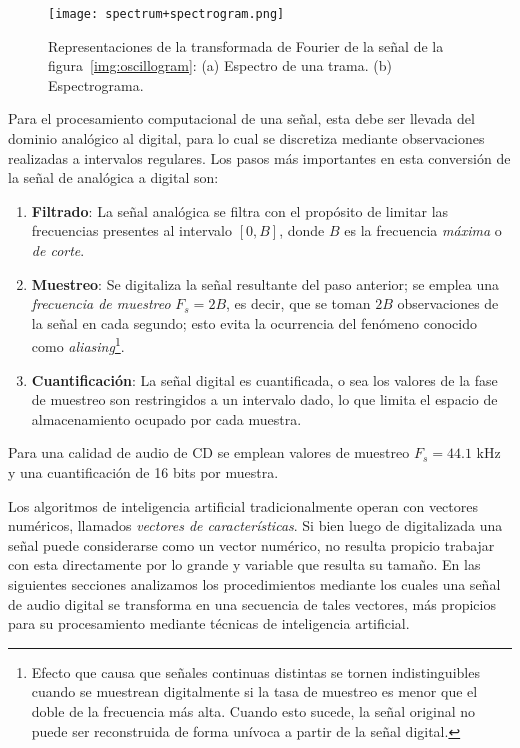 \begin{figure}[!h]
    \centering
    \texttt{[image: spectrum+spectrogram.png]}
    \caption{Representaciones de la transformada de Fourier de la señal de la figura~\ref{img:oscillogram}: (a) Espectro de una trama. (b) Espectrograma.}
    \label{img:spectrum+spectrogram}
\end{figure}

Para el procesamiento computacional de una señal, esta debe ser llevada del dominio analógico al digital, para lo cual se discretiza mediante observaciones realizadas a intervalos regulares.
Los pasos más importantes en esta conversión de la señal de analógica a digital son:

\begin{enumerate}
    \item \textbf{Filtrado}: La señal analógica se filtra con el propósito de limitar las frecuencias presentes al intervalo $[0,B]$, donde $B$ es la frecuencia \textit{máxima} o \textit{de corte}.
    \item \textbf{Muestreo}: Se digitaliza la señal resultante del paso anterior;
    se emplea una \textit{frecuencia de muestreo} $F_s = 2B$, es decir, que se toman $2B$ observaciones de la señal en cada segundo; esto evita la ocurrencia del fenómeno conocido como \textit{aliasing}\footnote{Efecto que causa que señales continuas distintas se tornen indistinguibles cuando se muestrean digitalmente si la tasa de muestreo es menor que el doble de la frecuencia más alta.
    Cuando esto sucede, la señal original no puede ser reconstruida de forma unívoca a partir de la señal digital.}.
    \item \textbf{Cuantificación}: La señal digital es cuantificada, o sea los valores de la fase de muestreo son restringidos a un intervalo dado, lo que limita el espacio de almacenamiento ocupado por cada muestra.
\end{enumerate}

Para una calidad de audio de CD se emplean valores de muestreo $F_s = 44.1$ kHz y una cuantificación de 16 bits por muestra.

Los algoritmos de inteligencia artificial tradicionalmente operan con vectores numéricos, llamados \textit{vectores de características}.
Si bien luego de digitalizada una señal puede considerarse como un vector numérico, no resulta propicio trabajar con esta directamente por lo grande y variable que resulta su tamaño.
En las siguientes secciones analizamos los procedimientos mediante los cuales una señal de audio digital se transforma en una secuencia de tales vectores, más propicios para su procesamiento mediante técnicas de inteligencia artificial.

